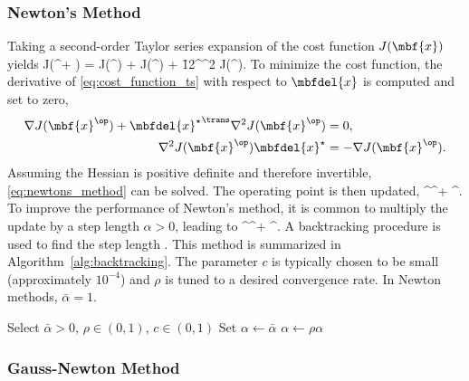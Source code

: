 \subsubsection{Newton's Method \cite{Barfoot2017}}
\label{sssec:newton}
Taking a second-order Taylor series expansion of the cost function $J(\mbf{x})$ yields
\beq
	J(^\op + ) = J(^\op) + \nabla J(^\op) + \f{1}{2}^\trans\nabla^2 J(^\op). \label{eq:cost_function_ts}
\eeq
To minimize the cost function, the derivative of \eqref{eq:cost_function_ts} with respect to $\mbfdel{x}$ is computed and set to zero,
\begin{align}
	 \nabla J(\mbf{x}^\op) + {\mbfdel{x}^\star}^\trans\nabla^2 J(\mbf{x}^\op) &= 0, \notag \\ 
	\nabla^2 J(\mbf{x}^\op){\mbfdel{x}^\star} &= -\nabla J(\mbf{x}^\op). \label{eq:newtons_method}
\end{align}
Assuming the Hessian is positive definite and therefore invertible, \eqref{eq:newtons_method} can be solved. The operating point is then updated,
\bdis
	^\op \leftarrow{}^\op + ^\star.
\edis
To improve the performance of Newton's method, it is common to multiply the update by a step length $\alpha > 0$, leading to
\bdis
	^\op \leftarrow{}^\op + \alpha{}^\star.
\edis
A backtracking procedure is used to find the step length \cite[p. 37]{Nocedal2006}. This method is summarized in Algorithm~\ref{alg:backtracking}. The parameter $c$ is typically chosen to be small (approximately $10^{-4}$) and $\rho$ is tuned to a desired convergence rate. In Newton methods, $\bar{\alpha} = 1$. 
\begin{algorithm}[H]
\singlespacing
\caption{}\label{alg:backtracking}
\begin{algorithmic}[1]
\State Select $\bar{\alpha} > 0$, $\rho \in (0,1)$, $c \in (0,1)$
\State Set $\alpha \gets \bar{\alpha}$
	\State $\alpha \gets \rho \alpha$
\EndWhile
\end{algorithmic}
\end{algorithm}

\subsubsection{Gauss-Newton Method}

